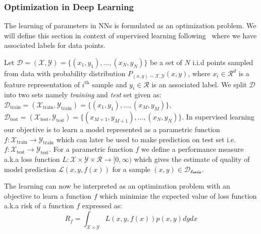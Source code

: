 
\subsubsection{Optimization in Deep Learning}
\label{sub:mll}
The learning of parameters in NNs is formulated as an optimization problem. We will define this section in context of supervised learning following~\cite{mitchell1990machine} where we have associated labels for data points.

Let $\mathcal{D}=(\mathcal{X},\mathcal{Y})=\{(x_1,y_1),...,(x_N,y_N)\}$ be a set of $N$ i.i.d points sampled from data with probability distribution $P_{(x,y)\sim \mathcal{X},\mathcal{Y}}(x,y)$, where $x_i\in\mathcal{R}^d$ is a feature representation of $i^\text{th}$ sample and $y_i\in\mathcal{R}$ is an associated label. We split $\mathcal{D}$ into two sets namely \emph{training} and \emph{test} set given as:
$\mathcal{D}_\text{train}=(\mathcal{X}_\text{train},\mathcal{Y}_\text{train})=\{(x_1,y_1),...,(x_M,y_M)\}$, $\mathcal{D}_\text{test}=(\mathcal{X}_\text{test},\mathcal{Y}_\text{test})=\{(x_{M+1},y_{M+1}),...,(x_N,y_N)\}$. In supervised learning our objective is to learn a model represented as a parametric function $f:\mathcal{X}_\text{train}\rightarrow\mathcal{Y}_\text{train}$ which can later be used to make prediction on test set i.e. $f:\mathcal{X}_\text{test}\rightarrow\mathcal{Y}_\text{test}$. For a parametric function $f$ we define a performance measure a.k.a loss function $L:\mathcal{X}\times\mathcal{Y}\times\mathcal{R}\rightarrow[0,\infty)$ which gives the estimate of quality of model prediction $\mathcal{L}(x,y,f(x))$ for a sample $(x,y)\in\mathcal{D_\text{train}}$. 

The learning can now be interpreted as an optimization problem with an objective to learn a function $f$ which minimize the expected value of loss function a.k.a risk of a function $f$ expressed as:
\begin{equation}
    R_f = \int_{\mathcal{X}\times\mathcal{Y}}L(x,y,f(x))p(x,y)dydx
\end{equation}

